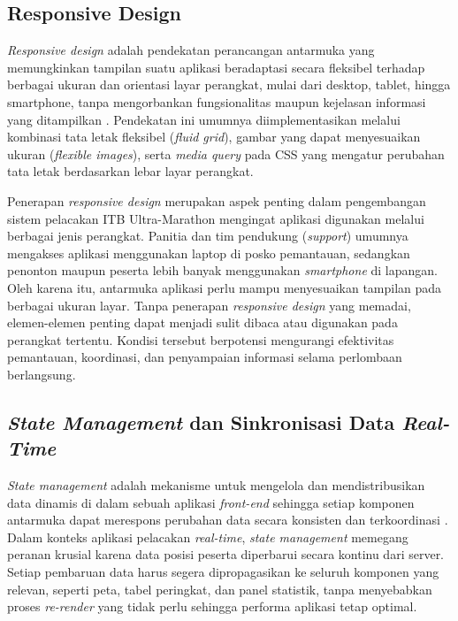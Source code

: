 \subsection{Responsive Design}
\label{subsec:responsive-design}
 
\textit{Responsive design} adalah pendekatan perancangan antarmuka yang memungkinkan tampilan suatu aplikasi beradaptasi secara fleksibel terhadap berbagai ukuran dan orientasi layar perangkat, mulai dari desktop, tablet, hingga smartphone, tanpa mengorbankan fungsionalitas maupun kejelasan informasi yang ditampilkan \cite{marcotte2017}. Pendekatan ini umumnya diimplementasikan melalui kombinasi tata letak fleksibel (\textit{fluid grid}), gambar yang dapat menyesuaikan ukuran (\textit{flexible images}), serta \textit{media query} pada CSS yang mengatur perubahan tata letak berdasarkan lebar layar perangkat.
 
Penerapan \textit{responsive design} merupakan aspek penting dalam pengembangan sistem pelacakan ITB Ultra-Marathon mengingat aplikasi digunakan melalui berbagai jenis perangkat. Panitia dan tim pendukung (\textit{support}) umumnya mengakses aplikasi menggunakan laptop di posko pemantauan, sedangkan penonton maupun peserta lebih banyak menggunakan \textit{smartphone} di lapangan. Oleh karena itu, antarmuka aplikasi perlu mampu menyesuaikan tampilan pada berbagai ukuran layar. Tanpa penerapan \textit{responsive design} yang memadai, elemen-elemen penting dapat menjadi sulit dibaca atau digunakan pada perangkat tertentu. Kondisi tersebut berpotensi mengurangi efektivitas pemantauan, koordinasi, dan penyampaian informasi selama perlombaan berlangsung.


\subsection{\textit{State Management} dan Sinkronisasi Data \textit{Real-Time}}
\label{subsec:state-management}

\textit{State management} adalah mekanisme untuk mengelola dan mendistribusikan data dinamis di dalam sebuah aplikasi \textit{front-end} sehingga setiap komponen antarmuka dapat merespons perubahan data secara konsisten dan terkoordinasi \cite{lazuardy2022modern}. Dalam konteks aplikasi pelacakan \textit{real-time}, \textit{state management} memegang peranan krusial karena data posisi peserta diperbarui secara kontinu dari server. Setiap pembaruan data harus segera dipropagasikan ke seluruh komponen yang relevan, seperti peta, tabel peringkat, dan panel statistik, tanpa menyebabkan proses \textit{re-render} yang tidak perlu sehingga performa aplikasi tetap optimal.

